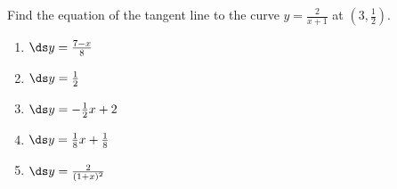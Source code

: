 \item Find the equation of the tangent line to the curve $y=\frac{2}{x+1}$ at $\left(3,\frac12\right)$.


\begin{multicols}{2}
	\begin{enumerate} \setlength{\itemsep}{.25cm}
	\item $\ds y = \frac{7-x}{8} $ %
	\item $\ds y = \frac12$ 
	\item $\ds y = -\frac12 x + 2$
	\item $\ds y= \frac18 x +\frac18$ 
	\item $\ds y= \frac{2}{(1+x)^2}$ 
	\end{enumerate}
\end{multicols}
